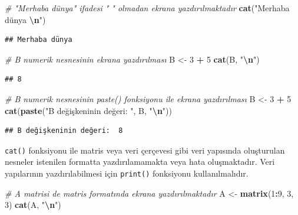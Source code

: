 \documentclass[
]{book}
\newenvironment{Shaded}{\begin{snugshade}}{\end{snugshade}}
\newcommand{\CommentTok}[1]{\textcolor[rgb]{0.56,0.35,0.01}{\textit{#1}}}
\newcommand{\DecValTok}[1]{\textcolor[rgb]{0.00,0.00,0.81}{#1}}
\newcommand{\FunctionTok}[1]{\textcolor[rgb]{0.13,0.29,0.53}{\textbf{#1}}}
\newcommand{\NormalTok}[1]{#1}
\newcommand{\OtherTok}[1]{\textcolor[rgb]{0.56,0.35,0.01}{#1}}
\newcommand{\SpecialCharTok}[1]{\textcolor[rgb]{0.81,0.36,0.00}{\textbf{#1}}}
\newcommand{\StringTok}[1]{\textcolor[rgb]{0.31,0.60,0.02}{#1}}
\begin{document}
\begin{Shaded}
\begin{Highlighting}[]
\CommentTok{\# "Merhaba dünya" ifadesi " " olmadan ekrana yazdırılmaktadır}
\FunctionTok{cat}\NormalTok{(}\StringTok{"Merhaba dünya }\SpecialCharTok{\textbackslash{}n}\StringTok{"}\NormalTok{)}
\end{Highlighting}
\end{Shaded}

\begin{verbatim}
## Merhaba dünya
\end{verbatim}

\begin{Shaded}
\begin{Highlighting}[]
\CommentTok{\# B numerik nesnesinin ekrana yazdırılması}
\NormalTok{B }\OtherTok{\textless{}{-}} \DecValTok{3} \SpecialCharTok{+} \DecValTok{5}
\FunctionTok{cat}\NormalTok{(B, }\StringTok{"}\SpecialCharTok{\textbackslash{}n}\StringTok{"}\NormalTok{)}
\end{Highlighting}
\end{Shaded}

\begin{verbatim}
## 8
\end{verbatim}

\begin{Shaded}
\begin{Highlighting}[]
\CommentTok{\# B numerik nesnesinin paste() fonksiyonu ile ekrana yazdırılması}
\NormalTok{B }\OtherTok{\textless{}{-}} \DecValTok{3} \SpecialCharTok{+} \DecValTok{5}
\FunctionTok{cat}\NormalTok{(}\FunctionTok{paste}\NormalTok{(}\StringTok{"B değişkeninin değeri: "}\NormalTok{, B, }\StringTok{"}\SpecialCharTok{\textbackslash{}n}\StringTok{"}\NormalTok{))}
\end{Highlighting}
\end{Shaded}

\begin{verbatim}
## B değişkeninin değeri:  8
\end{verbatim}

\texttt{cat()} fonksiyonu ile matris veya veri çerçevesi gibi veri yapısında oluşturulan nesneler istenilen formatta yazdırılamamakta veya hata oluşmaktadır. Veri yapılarının yazdırılabilmesi için \texttt{print()} fonksiyonu kullanılmalıdır.

\begin{Shaded}
\begin{Highlighting}[]
\CommentTok{\# A matrisi de matris formatında ekrana yazdırılmaktadır}
\NormalTok{A }\OtherTok{\textless{}{-}} \FunctionTok{matrix}\NormalTok{(}\DecValTok{1}\SpecialCharTok{:}\DecValTok{9}\NormalTok{, }\DecValTok{3}\NormalTok{, }\DecValTok{3}\NormalTok{)}
\FunctionTok{cat}\NormalTok{(A, }\StringTok{"}\SpecialCharTok{\textbackslash{}n}\StringTok{"}\NormalTok{)}
\end{Highlighting}
\end{Shaded}
\end{document}
